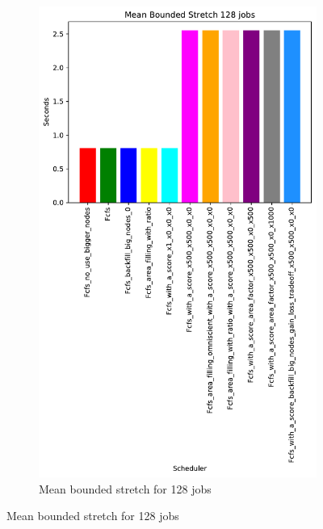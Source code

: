 \documentclass[a4paper]{article}
\begin{document}
\begin{figure}[H]
\begin{subfigure}[b]{0.4\linewidth}\centering\includegraphics[width=0.7\linewidth]{MBSS/plot/Results_Size_And_Data_2022-03-01->2022-03-03_V85105_Mean_Stretch_With_a_Minimum_128_450_128_32_256_4_1024.pdf}\caption{Mean bounded stretch for 128 jobs}\label{45}\end{subfigure}

\end{figure}
\end{document}
